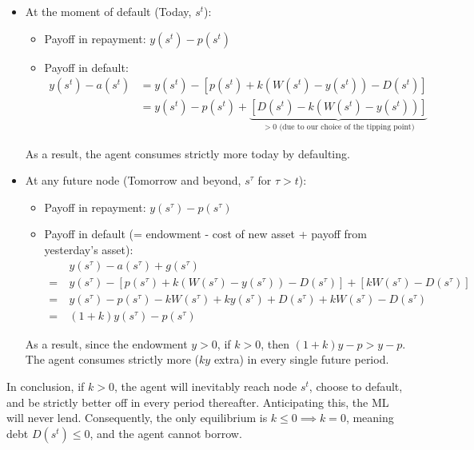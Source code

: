 \begin{itemize}
    \item At the moment of default (Today, $s^t$):
    \begin{itemize}
    \item Payoff in repayment: $y(s^t) - p(s^t)$ %
    \item Payoff in default: 
    \[
    \begin{aligned}
        y(s^t) - a(s^t) &= y(s^t) - \left[ p(s^t) + k\left(W(s^t) - y(s^t)\right) - D(s^t) \right] \\
        &= y(s^t) - p(s^t) + \underbrace{\left[ D(s^t) - k\left(W(s^t) - y(s^t)\right) \right]}_{> 0 \text{ (due to our choice of the tipping point)}}
    \end{aligned}
    \]
\end{itemize}
As a result, the agent consumes strictly more today by defaulting.
    \item At any future node (Tomorrow and beyond, $s^{\tau}$ for $\tau > t$):
    \begin{itemize}
    \item Payoff in repayment: $y(s^{\tau}) - p(s^{\tau})$ %
    \item Payoff in default (= endowment - cost of new asset + payoff from yesterday's asset):
    \[
    \begin{aligned}
        & y(s^{\tau}) - a(s^{\tau}) + g(s^{\tau}) \\
        = \ & y(s^{\tau}) - \left[ p(s^{\tau}) + k(W(s^{\tau}) - y(s^{\tau})) - D(s^{\tau}) \right] + \left[ kW(s^{\tau}) - D(s^{\tau}) \right] \\
        = \ & y(s^{\tau}) - p(s^{\tau}) - kW(s^{\tau}) + ky(s^{\tau}) + D(s^{\tau}) + kW(s^{\tau}) - D(s^{\tau}) \\
        = \ & (1+k)y(s^{\tau}) - p(s^{\tau})
    \end{aligned}
    \]
\end{itemize}
As a result, since the endowment $y > 0$, if $k > 0$, then $(1+k)y - p > y - p$. The agent consumes strictly more ($ky$ extra) in every single future period.
\end{itemize}

In conclusion, if $k > 0$, the agent will inevitably reach node $s^t$, choose to default, and be strictly better off in every period thereafter. Anticipating this, the ML will never lend. Consequently, the only equilibrium is $k \le 0 \implies k = 0$, meaning debt $D(s^t) \le 0$, and the agent cannot borrow.


